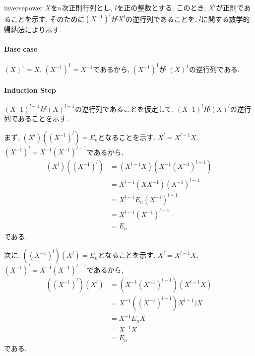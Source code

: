 \begin{proofof*}{inverse}{power}
  $X$を$n$次正則行列とし,
  $l$を正の整数とする.
  このとき, $X^l$が正則であることを示す.
  そのために$(X^{-1})^l$が$X^l$の逆行列であることを,
  $l$に関する数学的帰納法により示す.

  \paragraph{Base case}
  $(X)^{1}=X$, $(X^{-1})^{1}=X^{-1}$であるから,
  $(X^{-1})^{1}$が
  $(X)^{1}$の逆行列である.

  \paragraph{Induction Step}
  $(X^-1)^{l-1}$が$(X)^{l-1}$の逆行列であることを仮定して,
  $(X^-1)^{l}$が$(X)^{l}$の逆行列であることを示す.
  
  
  まず, $(X^l)((X^{-1})^l)=E_n$となることを示す.
  $X^l=X^{l-1}X$, 
  $(X^{-1})^l=X^{-1}(X^{-1})^{l-1}$であるから,
  \begin{align*}
    (X^l)((X^{-1})^l)
    &=(X^{l-1}X)(X^{-1}(X^{-1})^{l-1})\\
    &=X^{l-1}(XX^{-1})(X^{-1})^{l-1}\\
    &=X^{l-1}E_n(X^{-1})^{l-1}\\
    &=X^{l-1}(X^{-1})^{l-1}\\
    &=E_n
  \end{align*}
  である.

  次に, $((X^{-1})^l)(X^l)=E_n$となることを示す.
  $X^l=X^{l-1}X$, 
  $(X^{-1})^l=X^{-1}(X^{-1})^{l-1}$であるから,
  \begin{align*}
    ((X^{-1})^l)(X^l)
    &=(X^{-1}(X^{-1})^{l-1})(X^{l-1}X)\\
    &=X^{-1}((X^{-1})^{l-1})X^{l-1})X\\
    &=X^{-1}E_nX\\
    &=X^{-1}X\\
    &=E_n
  \end{align*}
  である.
\end{proofof*}



